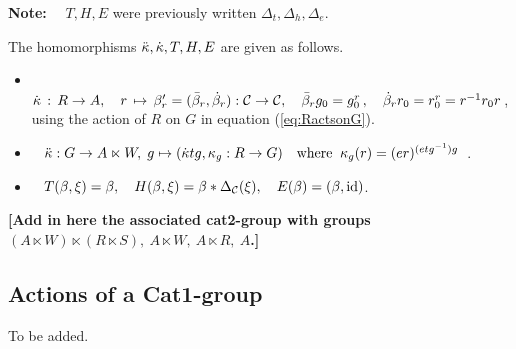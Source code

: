 \noindent
{\bf Note:}~~ $T,H,E$ were previously written $\Delta_t,\Delta_h,\Delta_e$. 

\bigskip\noindent
The homomorphisms 
$\ddot{\kappa}, \dot{\kappa}, T, H, E$ are given as follows.
\begin{itemize}
\item~
$\dot{\kappa} \,:\, R \to A, \quad
r \,\mapsto\, \beta'_r = (\bar{\beta}_r,\dot{\beta}_r) : \mathcal{C} \to \mathcal{C},
\quad  \bar{\beta}_r g_0 = g_0^r\,,
\quad  \dot{\beta}_r r_0 = r_0^r = r^{-1}r_0r$\,,\\
using the action of $R$ on $G$ in equation (\ref{eq:RactsonG}).
\item~
$\ddot{\kappa} : G \to A \ltimes W,\;
g \mapsto (\dot{\kappa} tg, \kappa_g : R \to G)
\quad\mbox{where}\;\;  \kappa_g(r) = (er)^{(etg^{-1})g}$~.
\item~
$T(\beta,\xi) = \beta, \quad
H(\beta,\xi) = \beta \ast \Delta_{\mathcal{C}}(\xi), \quad
E(\beta) = (\beta,\mathrm{id})$.
\end{itemize}

\bigskip\noindent
{\bf [Add in here the associated cat2-group with groups 
$(A \ltimes W) \ltimes (R \ltimes S),~
A \ltimes W,~ A \ltimes R,~ A$.]}







\subsection{Actions of a Cat1-group}

\begin{defn}
To be added.
\end{defn}
